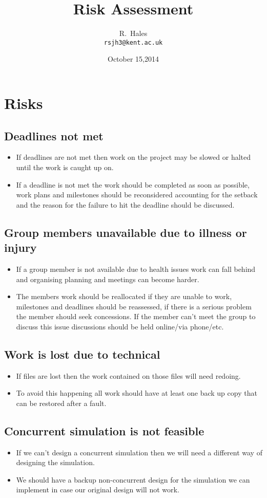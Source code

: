 \documentclass[a4paper,12pt]{article}
\begin{document}
\title{Risk Assessment}
\author{R.~Hales\\{\small\tt rsjh3@kent.ac.uk}}
\date{October 15,2014}

\maketitle

\section{Risks}
\subsection{Deadlines not met}
\begin{itemize}
\item If deadlines are not met then work on the project may be slowed or halted  until the work is caught up on.
\item If a deadline is not met the work should be completed as soon as possible, work plans and milestones should be reconsidered accounting for the setback and the reason for the failure to hit the deadline should be discussed.
\end{itemize}
\subsection{Group members unavailable due to illness or injury}
\begin{itemize}
\item If a group member is not available due to health issues work can fall behind and organising planning and meetings can become harder.
\item The members work should be reallocated if they are unable to work, milestones and deadlines should be reassessed, if there is a serious problem the member should seek concessions. If the member can't meet the group to discuss this issue discussions should be held online/via phone/etc.
\end{itemize}
\subsection{Work is lost due to technical}
\begin{itemize}
\item If files are lost then the work contained on those files will need redoing.
\item To avoid this happening all work should have at least one back up copy that can be restored after a fault.
\end{itemize}
\subsection{Concurrent simulation is not feasible}
\begin{itemize}
\item If we can't design a concurrent simulation then we will need a different way of designing the simulation.
\item We should have a backup non-concurrent design for the simulation we can implement in case our original design will not work.
\end{itemize}
\end{document}
